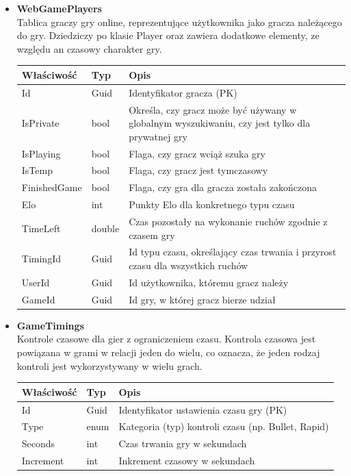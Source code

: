 \documentclass[12pt,a4paper]{article}
\begin{document}
\begin{itemize}
    \item \textbf{WebGamePlayers}\\
    Tablica graczy gry online, reprezentujące użytkownika jako gracza należącego do gry. Dziedziczy po klasie Player oraz zawiera dodatkowe elementy, ze względu an czasowy charakter gry.
    \renewcommand{\arraystretch}{1.5}
    \begin{longtable}{|m{4cm}|m{2cm}|m{8cm}|}
        \hline
        \rowcolor{lightgray}
        \textbf{Właściwość} & \textbf{Typ} & \textbf{Opis} \\ \hline
        \endhead
        \hline
        Id & Guid & Identyfikator gracza (PK) \\ \hline
        IsPrivate & bool & Określa, czy gracz może być używany w globalnym wyszukiwaniu, czy jest tylko dla prywatnej gry \\ \hline
        IsPlaying & bool & Flaga, czy gracz wciąż szuka gry \\ \hline
        IsTemp & bool & Flaga, czy gracz jest tymczasowy \\ \hline
        FinishedGame & bool & Flaga, czy gra dla gracza została zakończona \\ \hline
        Elo & int & Punkty Elo dla konkretnego typu czasu \\ \hline
        TimeLeft & double & Czas pozostały na wykonanie ruchów zgodnie z czasem gry \\ \hline
        TimingId & Guid & Id typu czasu, określający czas trwania i przyrost czasu dla wszystkich ruchów \\ \hline
        UserId & Guid & Id użytkownika, któremu gracz należy \\ \hline
        GameId & Guid & Id gry, w której gracz bierze udział \\ \hline
    \end{longtable}
 
\newpage

    \item \textbf{GameTimings}\\
    Kontrole czasowe dla gier z ograniczeniem czasu. Kontrola czasowa jest powiązana w grami w relacji jeden do wielu, co oznacza, że jeden rodzaj kontroli jest wykorzystywany w wielu grach.
    \renewcommand{\arraystretch}{1.5}
    \begin{longtable}{|m{4cm}|m{2cm}|m{8cm}|}
        \hline
        \rowcolor{lightgray}
        \textbf{Właściwość} & \textbf{Typ} & \textbf{Opis} \\ \hline
        \endhead
        \hline
        Id & Guid & Identyfikator ustawienia czasu gry (PK) \\ \hline
        Type & enum & Kategoria (typ) kontroli czasu (np. Bullet, Rapid) \\ \hline
        Seconds & int & Czas trwania gry w sekundach \\ \hline
        Increment & int & Inkrement czasowy w sekundach \\ \hline
    \end{longtable}


\end{itemize}
\end{document}
